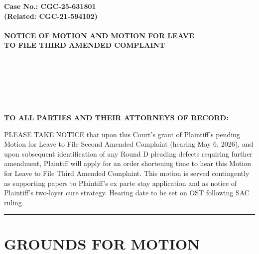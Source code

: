\begin{minipage}[t]{3in}
    \raggedright
    \noindent \textbf{Case No.: CGC-25-631801} \\
    \textbf{(Related: CGC-21-594102)} \\
    ~\\
    \textbf{NOTICE OF MOTION AND MOTION FOR LEAVE} \\
    \textbf{TO FILE THIRD AMENDED COMPLAINT} \\
    \vspace{2mm}
    \begin{singlespace}
    \setlength{\parindent}{0pt}
    \noindent{}\\
    \noindent{}\\
    \noindent{}\\
    \noindent{}\\
    \noindent{}\\
    \end{singlespace}
\end{minipage}
\vspace*{6mm}
\linenumbers
\textbf{TO ALL PARTIES AND THEIR ATTORNEYS OF RECORD:}

PLEASE TAKE NOTICE that upon this Court's grant of Plaintiff's pending Motion for Leave to File Second Amended Complaint (hearing May 6, 2026), and upon subsequent identification of any Round D pleading defects requiring further amendment, Plaintiff will apply for an order shortening time to hear this Motion for Leave to File Third Amended Complaint. This motion is served contingently as supporting papers to Plaintiff's ex parte stay application and as notice of Plaintiff's two-layer cure strategy. Hearing date to be set on OST following SAC ruling.

\begin{center}\rule{0.5\linewidth}{0.5pt}\end{center}

\section{GROUNDS FOR MOTION}\label{grounds-for-motion}

